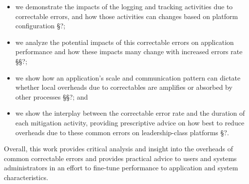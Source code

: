 \begin{itemize}

\item we demonstrate the impacts of the logging and tracking activities due to correctable
errors, and how those activities can changes based on platform configuration \S{?};
\item we analyze the potential impacts of this correctable errors on application
performance and how these impacts many change with increased errors rate \S\S{?};
\item we show how an application's scale and communication pattern can dictate
whether local overheads due to correctables are amplifies or absorbed by other
processes \S\S{?}; and
\item we show the interplay between the correctable error rate and the duration
of each mitigation activity, providing prescriptive advice on how best to reduce
overheads due to these common errors on leadership-class platforms \S{?}.

\end{itemize}

Overall, this work provides critical analysis and insight into the overheads of
common correctable errors and provides practical advice to users and systems
administrators in an effort to fine-tune performance to application and system
characteristics.
